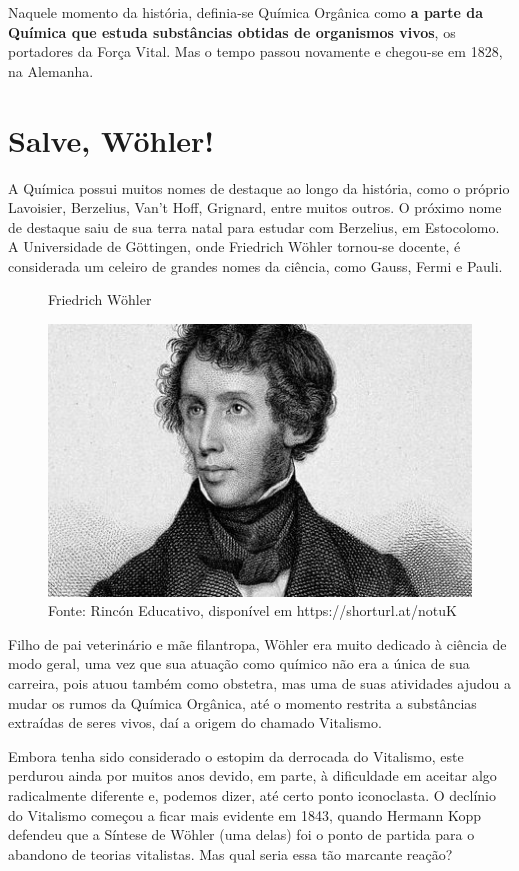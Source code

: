 \documentclass[a4paper,12pt,]{book}
\begin{document}
Naquele momento da história, definia-se Química Orgânica como \textbf{a parte da Química que estuda substâncias obtidas de organismos vivos}, os portadores da Força Vital. Mas o tempo passou novamente e chegou-se em 1828, na Alemanha.

\section{Salve, Wöhler!}
A Química possui muitos nomes de destaque ao longo da história, como o próprio Lavoisier, Berzelius, Van't Hoff, Grignard, entre muitos outros. O próximo nome de destaque saiu de sua terra natal para estudar com Berzelius, em Estocolomo. A Universidade de Göttingen, onde Friedrich Wöhler  tornou-se docente, é considerada um celeiro de grandes nomes da ciência, como Gauss, Fermi e Pauli.

\begin{figure}[h]
	\centering
	\caption{Friedrich Wöhler}
	\label{fig:wohler}
	\includegraphics[width=0.5\linewidth]{imagens/wohler.jpg}
	\caption*{Fonte: Rincón Educativo, disponível em https://shorturl.at/notuK}
\end{figure}

Filho de pai veterinário e mãe filantropa, Wöhler era muito dedicado à ciência de modo geral, uma vez que sua atuação como químico não era a única de sua carreira, pois atuou também como obstetra, mas uma de suas atividades ajudou a mudar os rumos da Química Orgânica, até o momento restrita a substâncias extraídas de seres vivos, daí a origem do chamado Vitalismo.

Embora tenha sido considerado o estopim da derrocada do Vitalismo, este perdurou ainda por muitos anos devido, em parte, à dificuldade em aceitar algo radicalmente diferente e, podemos dizer, até certo ponto iconoclasta. O declínio do Vitalismo começou a ficar mais evidente em 1843, quando Hermann Kopp defendeu que a Síntese de Wöhler (uma delas) foi o ponto de partida para o abandono de teorias vitalistas. Mas qual seria essa tão marcante reação?
\end{document}
